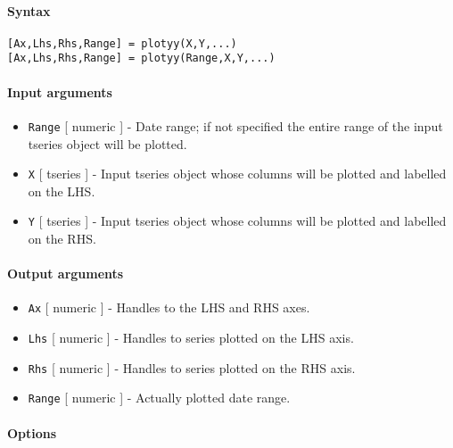 


	\paragraph{Syntax}

\begin{verbatim}
[Ax,Lhs,Rhs,Range] = plotyy(X,Y,...)
[Ax,Lhs,Rhs,Range] = plotyy(Range,X,Y,...)
\end{verbatim}

\paragraph{Input arguments}

\begin{itemize}
\item
  \texttt{Range} {[} numeric {]} - Date range; if not specified the
  entire range of the input tseries object will be plotted.
\item
  \texttt{X} {[} tseries {]} - Input tseries object whose columns will
  be plotted and labelled on the LHS.
\item
  \texttt{Y} {[} tseries {]} - Input tseries object whose columns will
  be plotted and labelled on the RHS.
\end{itemize}

\paragraph{Output arguments}

\begin{itemize}
\item
  \texttt{Ax} {[} numeric {]} - Handles to the LHS and RHS axes.
\item
  \texttt{Lhs} {[} numeric {]} - Handles to series plotted on the LHS
  axis.
\item
  \texttt{Rhs} {[} numeric {]} - Handles to series plotted on the RHS
  axis.
\item
  \texttt{Range} {[} numeric {]} - Actually plotted date range.
\end{itemize}

\paragraph{Options}

